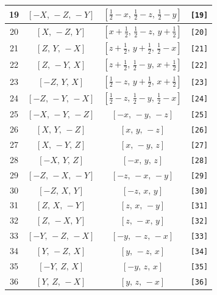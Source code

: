 \documentclass[fleqn,8pt]{jsarticle}
\begin{document}
\begin{longtable}{cccc}
19 & $\left[ - X,\, - Z,\, - Y \right]$ & $\left[ \frac{1}{2} - x,\, \frac{1}{2} - z,\, \frac{1}{2} - y \right]$ & {\tt [19]} \\ \hline
20 & $\left[ X,\, - Z,\, Y \right]$ & $\left[ x + \frac{1}{2},\, \frac{1}{2} - z,\, y + \frac{1}{2} \right]$ & {\tt [20]} \\ \hline
21 & $\left[ Z,\, Y,\, - X \right]$ & $\left[ z + \frac{1}{2},\, y + \frac{1}{2},\, \frac{1}{2} - x \right]$ & {\tt [21]} \\ \hline
22 & $\left[ Z,\, - Y,\, X \right]$ & $\left[ z + \frac{1}{2},\, \frac{1}{2} - y,\, x + \frac{1}{2} \right]$ & {\tt [22]} \\ \hline
23 & $\left[ - Z,\, Y,\, X \right]$ & $\left[ \frac{1}{2} - z,\, y + \frac{1}{2},\, x + \frac{1}{2} \right]$ & {\tt [23]} \\ \hline
24 & $\left[ - Z,\, - Y,\, - X \right]$ & $\left[ \frac{1}{2} - z,\, \frac{1}{2} - y,\, \frac{1}{2} - x \right]$ & {\tt [24]} \\ \hline
25 & $\left[ - X,\, - Y,\, - Z \right]$ & $\left[ - x,\, - y,\, - z \right]$ & {\tt [25]} \\ \hline
26 & $\left[ X,\, Y,\, - Z \right]$ & $\left[ x,\, y,\, - z \right]$ & {\tt [26]} \\ \hline
27 & $\left[ X,\, - Y,\, Z \right]$ & $\left[ x,\, - y,\, z \right]$ & {\tt [27]} \\ \hline
28 & $\left[ - X,\, Y,\, Z \right]$ & $\left[ - x,\, y,\, z \right]$ & {\tt [28]} \\ \hline
29 & $\left[ - Z,\, - X,\, - Y \right]$ & $\left[ - z,\, - x,\, - y \right]$ & {\tt [29]} \\ \hline
30 & $\left[ - Z,\, X,\, Y \right]$ & $\left[ - z,\, x,\, y \right]$ & {\tt [30]} \\ \hline
31 & $\left[ Z,\, X,\, - Y \right]$ & $\left[ z,\, x,\, - y \right]$ & {\tt [31]} \\ \hline
32 & $\left[ Z,\, - X,\, Y \right]$ & $\left[ z,\, - x,\, y \right]$ & {\tt [32]} \\ \hline
33 & $\left[ - Y,\, - Z,\, - X \right]$ & $\left[ - y,\, - z,\, - x \right]$ & {\tt [33]} \\ \hline
34 & $\left[ Y,\, - Z,\, X \right]$ & $\left[ y,\, - z,\, x \right]$ & {\tt [34]} \\ \hline
35 & $\left[ - Y,\, Z,\, X \right]$ & $\left[ - y,\, z,\, x \right]$ & {\tt [35]} \\ \hline
36 & $\left[ Y,\, Z,\, - X \right]$ & $\left[ y,\, z,\, - x \right]$ & {\tt [36]} \\ \hline

\end{longtable}
\end{document}
